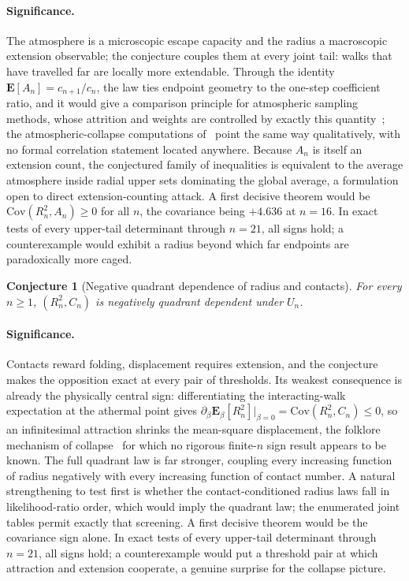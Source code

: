 \documentclass[11pt]{article}
\newtheorem{conjecture}{Conjecture}
\theoremstyle{definition}
\begin{document}
\paragraph{Significance.}
The atmosphere is a microscopic escape capacity and the radius a macroscopic extension observable; the conjecture couples them at every joint tail: walks that have travelled far are locally more extendable.  Through the identity $\mathbf E[A_n]=c_{n+1}/c_n$, the law ties endpoint geometry to the one-step coefficient ratio, and it would give a comparison principle for atmospheric sampling methods, whose attrition and weights are controlled by exactly this quantity~\cite{RJvR08,OP08}; the atmospheric-collapse computations of~\cite{AJvR09} point the same way qualitatively, with no formal correlation statement located anywhere.  Because $A_n$ is itself an extension count, the conjectured family of inequalities is equivalent to the average atmosphere inside radial upper sets dominating the global average, a formulation open to direct extension-counting attack.  A first decisive theorem would be $\mathrm{Cov}(R_n^2,A_n)\ge0$ for all $n$, the covariance being $+4.636$ at $n=16$.  In exact tests of every upper-tail determinant through $n=21$, all signs hold; a counterexample would exhibit a radius beyond which far endpoints are paradoxically more caged.

\begin{conjecture}[Negative quadrant dependence of radius and contacts]\label{af11}
For every $n\ge1$, $(R_n^2,C_n)$ is negatively quadrant dependent under $U_n$.
\end{conjecture}

\paragraph{Significance.}
Contacts reward folding, displacement requires extension, and the conjecture makes the opposition exact at every pair of thresholds.  Its weakest consequence is already the physically central sign: differentiating the interacting-walk expectation at the athermal point gives $\partial_\beta\mathbf E_\beta[R_n^2]\big|_{\beta=0}=\mathrm{Cov}(R_n^2,C_n)\le0$, so an infinitesimal attraction shrinks the mean-square displacement, the folklore mechanism of collapse~\cite{BOS01,BGJ20} for which no rigorous finite-$n$ sign result appears to be known.  The full quadrant law is far stronger, coupling every increasing function of radius negatively with every increasing function of contact number.  A natural strengthening to test first is whether the contact-conditioned radius laws fall in likelihood-ratio order, which would imply the quadrant law; the enumerated joint tables permit exactly that screening.  A first decisive theorem would be the covariance sign alone.  In exact tests of every upper-tail determinant through $n=21$, all signs hold; a counterexample would put a threshold pair at which attraction and extension cooperate, a genuine surprise for the collapse picture.
\end{document}
